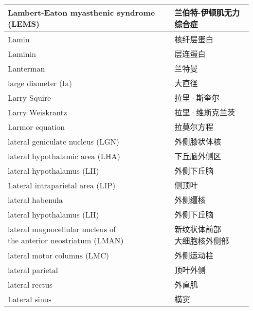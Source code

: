 \begin{longtable}{lll}
	\midrule
	Lambert-Eaton myasthenic syndrome (LEMS)  && 兰伯特-伊顿肌无力综合症  \\
	
	\midrule
	Lamin     &&  核纤层蛋白  \\
	
	\midrule
	Laminin     &&  层连蛋白  \\
	
	\midrule
	Lanterman     &&  兰特曼  \\
	
	\midrule
	large diameter (Ia)     &&  大直径  \\
	
	\midrule
	Larry Squire   && 拉里·斯奎尔  \\
	
	\midrule
	Larry Weiskrantz   && 拉里·维斯克兰茨  \\
	
	\midrule
	Larmor equation   && 拉莫尔方程  \\
	
	\midrule
	lateral geniculate nucleus (LGN)   && 外侧膝状体核  \\
	
	\midrule
	lateral hypothalamic area (LHA)  && 下丘脑外侧区  \\
	
	\midrule
	lateral hypothalamus (LH)  && 外侧下丘脑  \\
	
	\midrule
	Lateral intraparietal area (LIP)   && 侧顶叶  \\
	
	\midrule
	lateral habenula   && 外侧缰核  \\
	
	\midrule
	lateral	hypothalamus (LH)  && 外侧下丘脑  \\
	
	\midrule
	\makecell[l]{lateral magnocellular nucleus of \\ the anterior neostriatum (LMAN)}  && \makecell[l]{新纹状体前部\\大细胞核外侧部}  \\
	
	\midrule
	lateral motor columns (LMC)   && 外侧运动柱  \\
	
	\midrule
	lateral parietal   && 顶叶外侧  \\
	
	\midrule
	lateral rectus   && 外直肌  \\
	
	\midrule
	Lateral sinus   && 横窦  \\
	

\end{longtable}

